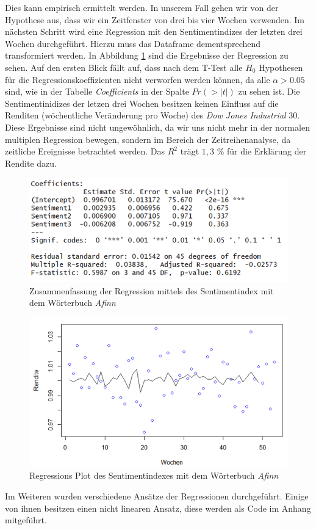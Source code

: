 Dies kann empirisch ermittelt werden. In unserem Fall gehen wir von der Hypothese aus, dass wir ein Zeitfenster von drei bis vier Wochen verwenden. Im nächsten Schritt wird eine Regression mit den Sentimentindizes der letzten drei Wochen durchgeführt. Hierzu muss das Dataframe dementsprechend transformiert werden. In Abbildung \ref{Afinn_summary} sind die Ergebnisse der Regression zu sehen. Auf den ersten Blick fällt auf, dass nach dem T-Test alle $H_{0}$ Hypothesen für die Regressionskoeffizienten nicht verworfen werden können, da alle $\alpha>0.05$ sind, wie in der Tabelle \textit{Coefficients} in der Spalte $Pr(>|t|)$ zu sehen ist. Die Sentimentinidizes der letzen drei Wochen besitzen keinen Einfluss auf die Renditen (wöchentliche Veränderung pro Woche)  des \textit{Dow Jones Industrial} $30$. Diese Ergebnisse sind nicht ungewöhnlich, da wir uns nicht mehr in der normalen multiplen Regression bewegen, sondern im Bereich der Zeitreihenanalyse, da zeitliche Ereignisse betrachtet werden. Das $R^2$ trägt $1,3$ \% für die Erklärung der Rendite dazu. 

 \begin{figure}[H]
	\centering
	\includegraphics[width=1\textwidth]{Pictures/afinn_summary.png}
	\caption{Zusammenfassung der Regression mittels des Sentimentindex mit dem Wörterbuch \textit{Afinn} }
	\label{Afinn_summary}
\end{figure} 
\begin{figure}[H]
	\centering
	\includegraphics[width=1\textwidth]{Pictures/Afinn_plot.png}
	\caption{Regressions Plot des Sentimentindexes mit dem Wörterbuch \textit{Afinn} }
	\label{Afinn_plot_regression}
\end{figure} 
Im Weiteren wurden verschiedene Ansätze der Regressionen durchgeführt. Einige von ihnen besitzen einen nicht linearen Ansatz, diese werden als Code im Anhang mitgeführt.  


